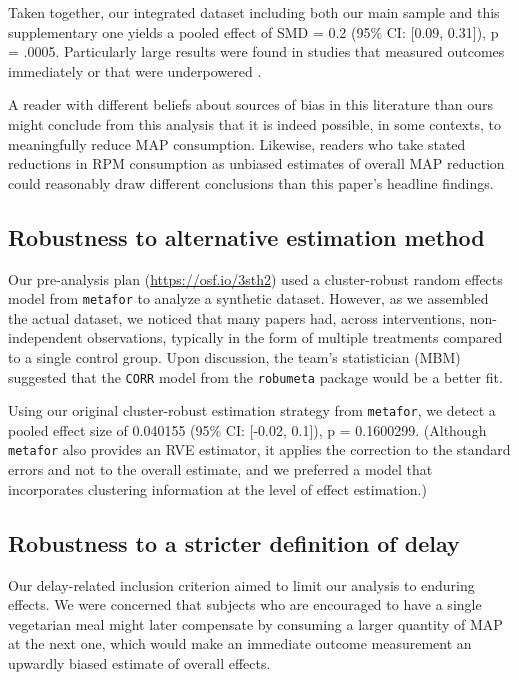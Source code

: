 \documentclass[sn-nature,referee,pdflatex]{sn-jnl}
\begin{document}
Taken together, our integrated dataset including both our main sample
and this supplementary one yields a pooled effect of SMD = 0.2 (95\% CI:
{[}0.09, 0.31{]}), p = .0005. Particularly large results were found in
studies that measured outcomes immediately \citep{hansen2021} or that
were underpowered \citep{lentz2020}.

A reader with different beliefs about sources of bias in this literature
than ours might conclude from this analysis that it is indeed possible,
in some contexts, to meaningfully reduce MAP consumption. Likewise,
readers who take stated reductions in RPM consumption as unbiased
estimates of overall MAP reduction could reasonably draw different
conclusions than this paper's headline findings.

\subsection{Robustness to alternative estimation method}\label{Sec5.1.2}

Our pre-analysis plan (\url{https://osf.io/3sth2}) used a cluster-robust
random effects model from \texttt{metafor} to analyze a synthetic
dataset. However, as we assembled the actual dataset, we noticed that
many papers had, across interventions, non-independent observations,
typically in the form of multiple treatments compared to a single
control group. Upon discussion, the team's statistician (MBM) suggested
that the \texttt{CORR} model from the \texttt{robumeta} package would be
a better fit.

Using our original cluster-robust estimation strategy from
\texttt{metafor}, we detect a pooled effect size of 0.040155 (95\% CI:
{[}-0.02, 0.1{]}), p = 0.1600299. (Although \texttt{metafor} also
provides an RVE estimator, it applies the correction to the standard
errors and not to the overall estimate, and we preferred a model that
incorporates clustering information at the level of effect estimation.)

\subsection{Robustness to a stricter definition of
delay}\label{Sec5.1.3}

Our delay-related inclusion criterion aimed to limit our analysis to
enduring effects. We were concerned that subjects who are encouraged to
have a single vegetarian meal might later compensate by consuming a
larger quantity of MAP at the next one, which would make an immediate
outcome measurement an upwardly biased estimate of overall effects.
\end{document}
